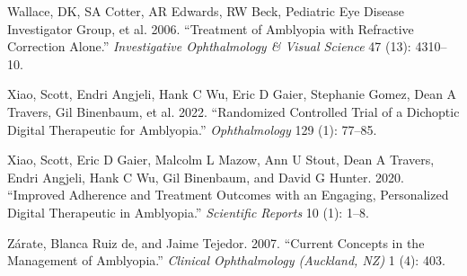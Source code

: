 \documentclass[
  letterpaper,
  DIV=11,
  numbers=noendperiod]{scrreprt}
\newlength{\cslhangindent}
\newlength{\cslentryspacingunit} %
\newenvironment{CSLReferences}[2] %
 {%
  \setlength{\parindent}{0pt}
  \ifodd #1
  \let\oldpar\par
  \def\par{\hangindent=\cslhangindent\oldpar}
  \fi
  \setlength{\parskip}{#2\cslentryspacingunit}
 }%
 {}
\begin{document}
\begin{CSLReferences}{1}{0}
\leavevmode{}%
Wallace, DK, SA Cotter, AR Edwards, RW Beck, Pediatric Eye Disease
Investigator Group, et al. 2006. {``Treatment of Amblyopia with
Refractive Correction Alone.''} \emph{Investigative Ophthalmology \&
Visual Science} 47 (13): 4310--10.

\leavevmode{}%
Xiao, Scott, Endri Angjeli, Hank C Wu, Eric D Gaier, Stephanie Gomez,
Dean A Travers, Gil Binenbaum, et al. 2022. {``Randomized Controlled
Trial of a Dichoptic Digital Therapeutic for Amblyopia.''}
\emph{Ophthalmology} 129 (1): 77--85.

\leavevmode{}%
Xiao, Scott, Eric D Gaier, Malcolm L Mazow, Ann U Stout, Dean A Travers,
Endri Angjeli, Hank C Wu, Gil Binenbaum, and David G Hunter. 2020.
{``Improved Adherence and Treatment Outcomes with an Engaging,
Personalized Digital Therapeutic in Amblyopia.''} \emph{Scientific
Reports} 10 (1): 1--8.

\leavevmode{}%
Zárate, Blanca Ruiz de, and Jaime Tejedor. 2007. {``Current Concepts in
the Management of Amblyopia.''} \emph{Clinical Ophthalmology (Auckland,
NZ)} 1 (4): 403.

\end{CSLReferences}
\end{document}
